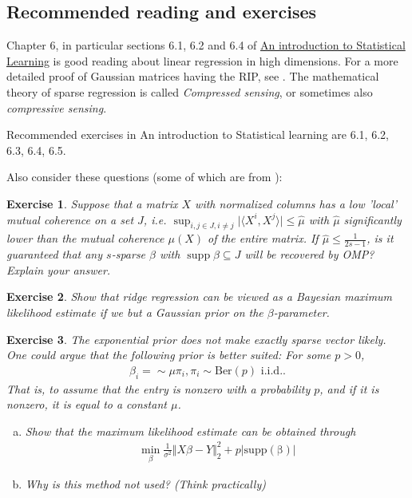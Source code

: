 \documentclass{article}
\DeclareMathOperator{\supp}{\mathrm{supp}}
\newcommand{\sprod}[1]{\langle #1 \rangle}
\newcommand{\sse}{\subseteq}
\newtheorem{exercise}{Exercise}
\newcommand{\abs}[1]{\vert #1 \vert}
\newcommand{\norm}[1]{\Vert #1 \Vert}
\begin{document}
\subsection{Recommended reading and exercises}
Chapter 6, in particular sections 6.1, 6.2 and 6.4 of \href{https://www.statlearning.com/}{An introduction to Statistical Learning} is good reading about linear regression in high dimensions. For a more detailed proof of Gaussian matrices having the RIP, see \cite{baraniuk2008simple}. The mathematical theory of sparse regression is called \emph{Compressed sensing}, or sometimes also \emph{compressive sensing}.

\smallskip

Recommended exercises in An introduction to Statistical learning are 6.1, 6.2, 6.3, 6.4, 6.5.
\smallskip

Also consider these questions (some of which are from \cite{foucart2011hard}):

\begin{exercise}
    Suppose that a matrix $X$ with normalized columns has a low 'local' mutual coherence on a set $J$, i.e. $\sup_{i,j \in J, i\neq j} \abs{\sprod{X^i,X^j}} \leq \widehat{\mu}$ with $\widehat{\mu}$ significantly lower than the mutual coherence $\mu(X)$ of the entire matrix. If $\widehat{\mu}\leq \tfrac{1}{2s-1}$, is it guaranteed that any $s$-sparse $\beta$ with $\supp \beta \sse J$ will be recovered by OMP? Explain your answer.
\end{exercise}

\begin{exercise}
    Show that ridge regression can be viewed as a Bayesian maximum likelihood estimate if we but a Gaussian prior on the $\beta$-parameter.
\end{exercise}

\begin{exercise}
    The exponential prior does not make exactly sparse vector likely. One could argue that the following prior is better suited: For some $p>0$,
    \begin{align*}
        \beta_i=\sim \mu \pi_i , \pi_i \sim\mathrm{Ber}(p) \text{ i.i.d.}.
    \end{align*}
    That is, to assume that the entry is nonzero with a probability $p$, and if it is nonzero, it is equal to a constant $\mu$.
    \begin{enumerate}[(a)]
        \item Show that the maximum likelihood estimate can be obtained through
        \begin{align*}
            \min_{\beta} \tfrac{1}{\sigma^2} \norm{X\beta-Y}_2^2 + p \abs{\mathrm{supp(\beta)}}
        \end{align*}
        \item Why is this method not used? (Think practically)
    \end{enumerate}
\end{exercise}
\end{document}
